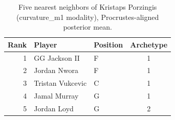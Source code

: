 \begin{table}[htbp]
  \centering\small
  \begin{tabular}{rllc}
    \toprule
    Rank & Player & Position & Archetype \\
    \midrule
    1 & GG Jackson II & F & 1 \\
    2 & Jordan Nwora & F & 1 \\
    3 & Tristan Vukcevic & C & 1 \\
    4 & Jamal Murray & G & 1 \\
    5 & Jordan Loyd & G & 2 \\
    \bottomrule
  \end{tabular}
  \caption{Five nearest neighbors of Kristaps Porzingis (curvature_m1 modality), Procrustes-aligned posterior mean.}
  \label{tab:Kristaps_Porzingis_neighbors_curvature_m1}
\end{table}

